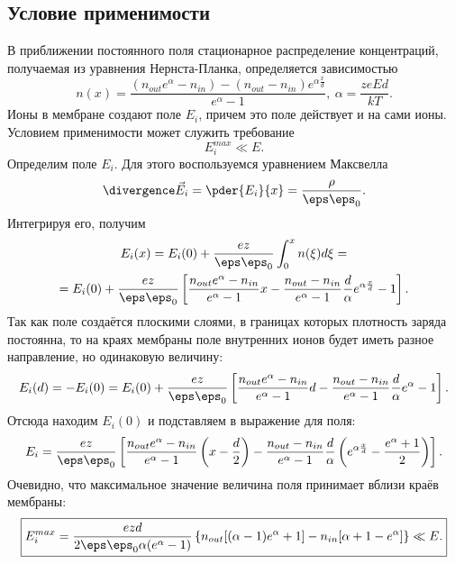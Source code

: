\documentclass{hedwork}
\begin{document}
\subsection{Условие применимости}
    В приближении постоянного поля стационарное распределение концентраций,
    получаемая из уравнения Нернста-Планка, определяется зависимостью
    \[
        n(x) = \frac{(n_{out}e^\alpha - n_{in}) - (n_{out} -
        n_{in})e^{\alpha\frac{x}{d}}}{e^\alpha - 1},\ \alpha = \frac{zeEd}{kT}.
    \]
    Ионы в мембране создают поле \( E_i \), причем это поле действует и на
    сами ионы. Условием применимости может служить требование
    \[
        E_i^{max} \ll E.
    \]
    Определим поле \( E_i \). Для этого воспользуемся уравнением Максвелла
    \[
        \divergence\vec{E}_i = \pder{E_i}{x} = \frac{\rho}{\eps\eps_0}.
    \]
    Интегрируя его, получим
    \begin{gather}
        E_i(x) = E_i(0) + \frac{ez}{\eps\eps_0}\int_0^x n(\xi)d\xi = \nonumber\\
        = E_i(0) + \frac{ez}{\eps\eps_0}\left[
        \frac{n_{out}e^\alpha - n_{in}}{e^\alpha - 1}x - \frac{n_{out} -
        n_{in}}{e^\alpha - 1}\frac{d}{\alpha}{e^{\alpha\frac{x}{d}} - 1}
        \right].
    \end{gather}
    Так как поле создаётся плоскими слоями, в границах которых плотность заряда
    постоянна, то на краях мембраны поле внутренних ионов будет иметь разное
    направление, но одинаковую величину:
    \begin{equation}
        E_i(d) = -E_i(0) = E_i(0) + \frac{ez}{\eps\eps_0}\left[
        \frac{n_{out}e^\alpha - n_{in}}{e^\alpha - 1}d - \frac{n_{out} -
        n_{in}}{e^\alpha - 1}\frac{d}{\alpha}{e^\alpha - 1}
        \right].
    \end{equation}
    Отсюда находим \( E_i(0) \) и подставляем в выражение для поля:
    \begin{equation}
        E_i = \frac{ez}{\eps\eps_0}\left[
        \frac{n_{out}e^\alpha - n_{in}}{e^\alpha - 1}\left(x-\frac{d}{2}\right)
        - \frac{n_{out} - n_{in}}{e^\alpha - 1}\frac{d}{\alpha}
        \left(e^{\alpha\frac{x}{d}} - \frac{e^\alpha + 1}{2}\right)
        \right].
    \end{equation}
    Очевидно, что максимальное значение величина поля принимает вблизи краёв
    мембраны:
    \begin{equation}
        \boxed{
        E_i^{max} = \frac{ezd}{2\eps\eps_0\alpha(e^\alpha - 1)}\left\{
            n_{out}[(\alpha - 1)e^\alpha + 1] - n_{in}[\alpha + 1 - e^\alpha]
        \right\} \ll E.}
    \end{equation}
\end{document}
